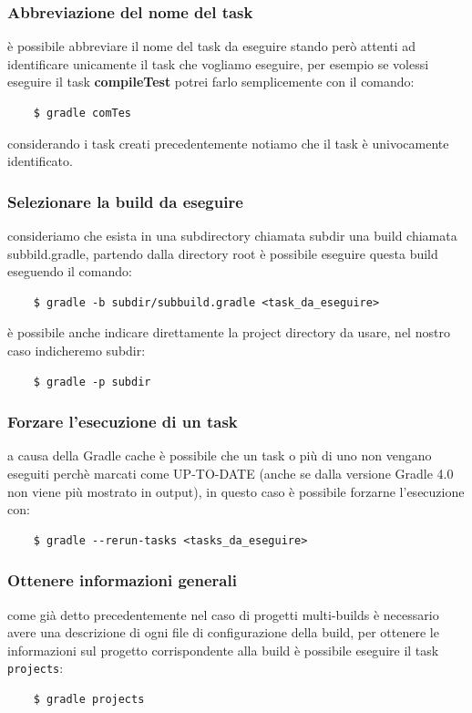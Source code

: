 \documentclass{article}
\begin{document}
\begin{flushleft}
\subsubsection{Abbreviazione del nome del task} è possibile abbreviare il nome del task da eseguire stando però attenti ad identificare unicamente il task che vogliamo eseguire, per esempio se volessi eseguire il task \textbf{compileTest} potrei farlo semplicemente con il comando:
\begin{verbatim}
    $ gradle comTes \end{verbatim}
considerando i task creati precedentemente notiamo che il task è univocamente identificato.

\subsubsection{Selezionare la build da eseguire} consideriamo che esista in una subdirectory chiamata subdir una build chiamata subbild.gradle, partendo dalla directory root è possibile eseguire questa build eseguendo il comando:
\begin{verbatim}
    $ gradle -b subdir/subbuild.gradle <task_da_eseguire> \end{verbatim}
è possibile anche indicare direttamente la project directory da usare, nel nostro caso indicheremo subdir:
\begin{verbatim}
    $ gradle -p subdir  \end{verbatim}

\subsubsection{Forzare l'esecuzione di un task} a causa della Gradle cache è possibile che un task o più di uno non vengano eseguiti perchè marcati come UP-TO-DATE (anche se dalla versione Gradle 4.0 non viene più mostrato in output), in questo caso è possibile forzarne l'esecuzione con:
\begin{verbatim}
    $ gradle --rerun-tasks <tasks_da_eseguire> \end{verbatim}

\subsubsection{Ottenere informazioni generali} come già detto precedentemente nel caso di progetti multi-builds è necessario avere una descrizione di ogni file di configurazione della build, per ottenere le informazioni sul progetto corrispondente alla build è possibile eseguire il task \texttt{projects}:
\begin{verbatim}
    $ gradle projects \end{verbatim}


\end{flushleft}
\end{document}

